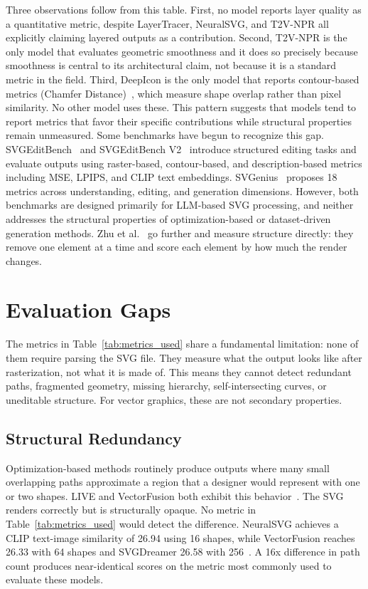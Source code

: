 Three observations follow from this table. First, no model 
reports layer quality as a quantitative metric, despite 
LayerTracer, NeuralSVG, and T2V-NPR all explicitly claiming 
layered outputs as a contribution. Second, T2V-NPR is the 
only model that evaluates geometric smoothness and it 
does so precisely because smoothness is central to its 
architectural claim, not because it is a standard metric 
in the field. Third, DeepIcon is the only model that reports contour-based 
metrics (Chamfer 
Distance)~\cite{bingDeepIconHierarchicalNetwork2024}, which 
measure shape overlap rather than pixel similarity. No other 
model uses these. This pattern suggests that models tend to 
report metrics that favor their specific contributions while 
structural properties remain unmeasured. 
Some benchmarks have begun to recognize this gap. 
SVGEditBench~\cite{nishinaSVGEditBenchBenchmarkDataset2024} 
and SVGEditBench 
V2~\cite{nishinaSVGEditBenchV22025} introduce structured 
editing tasks and evaluate outputs using raster-based, 
contour-based, and description-based metrics including MSE, 
LPIPS, and CLIP text embeddings. SVGenius~\cite{chenSVGenius2025} 
proposes 18 metrics across understanding, editing, and 
generation dimensions. However, both benchmarks are 
designed primarily for LLM-based SVG processing, and 
neither addresses the structural properties of 
optimization-based or dataset-driven generation methods. 
Zhu et al.~\cite{zhuStructuralEvaluationMetrics2026} go further 
and measure structure directly: they remove one element at a time and score each 
element by how much the render changes. 



\section{Evaluation Gaps}
\label{sec:eval_gaps}

The metrics in Table~\ref{tab:metrics_used} share a 
fundamental limitation: none of them require parsing 
the SVG file. They measure what the output looks like 
after rasterization, not what it is made of. This means 
they cannot detect redundant paths, fragmented geometry, 
missing hierarchy, self-intersecting curves, or 
uneditable structure. For vector graphics, these are 
not secondary properties.

\subsection{Structural Redundancy}
Optimization-based 
methods routinely produce outputs where many small 
overlapping paths approximate a region that a designer 
would represent with one or two shapes. LIVE and 
VectorFusion both exhibit this 
behavior~\cite{maLayerwiseImageVectorization2022, 
jainVectorFusionTexttoSVGAbstracting2022}. The SVG renders 
correctly but is structurally opaque. No metric in 
Table~\ref{tab:metrics_used} would detect the difference. 
NeuralSVG achieves a CLIP text-image similarity of 26.94 
using 16 shapes, while VectorFusion reaches 26.33 with 64 
shapes and SVGDreamer 26.58 with 
256~\cite{polaczekNeuralSVGImplicitRepresentation2025}. 
A 16x difference in path count produces near-identical 
scores on the metric most commonly used to evaluate 
these models.

